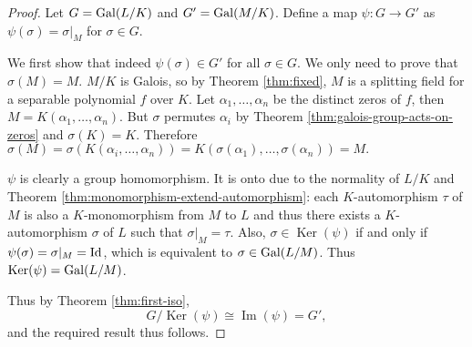 \begin{proof}
	Let $G = \operatorname{Gal}(L/K)$ and $G' = \operatorname{Gal}(M/K)$. Define a map $\psi: G \to G'$ as $\psi(\sigma) = \sigma | _M$ for $\sigma \in G$.
	
	We first show that indeed $\psi(\sigma) \in G'$ for all $\sigma \in G$. We only need to prove that $\sigma(M) = M$. $M/K$ is Galois, so by Theorem \ref{thm:fixed}, $M$ is a splitting field for a separable polynomial $f$ over $K$. Let $\alpha_1, \dots, \alpha_n$ be the distinct zeros of $f$, then $M = K(\alpha_1, \ldots, \alpha_n)$. But $\sigma$ permutes $\alpha_i$ by Theorem \ref{thm:galois-group-acts-on-zeros} and $\sigma(K) = K$. Therefore $\sigma(M) = \sigma(K(\alpha_i, \ldots, \alpha_n)) = K(\sigma(\alpha_1), \ldots, \sigma(\alpha_n)) = M. $
	
	
	 $\psi$ is clearly a group homomorphism. It is onto due to the normality of $L/K$ and Theorem \ref{thm:monomorphism-extend-automorphism}: each $K$-automorphism $\tau$ of $M$ is also a $K$-monomorphism from $M$ to $L$ and thus there exists a $K$-automorphism $\sigma$ of $L$ such that $\sigma | _M = \tau$. Also, $\sigma \in \operatorname{Ker}(\psi)$ if and only if $\psi(\sigma) = \sigma |_M = \operatorname{Id}$, which is equivalent to $\sigma \in \operatorname{Gal}(L/M)$. Thus $\operatorname{Ker}(\psi) = \operatorname{Gal}(L/M)$. 
	 
	 Thus by Theorem \ref{thm:first-iso}, 
	$$G / \operatorname{Ker}(\psi) \cong \operatorname{Im}(\psi) = G',$$
	and the required result thus follows. 
\end{proof}
